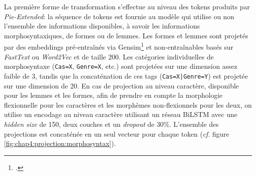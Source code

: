 La première forme de transformation s'effectue au niveau des tokens produits par \textit{Pie-Extended}: la séquence de tokens est fournie au modèle qui utilise ou non l'ensemble des informations disponibles, à savoir les informations morphosyntaxiques, de formes ou de lemmes. Les formes et lemmes sont projetés par des embeddings pré-entraînés via Gensim\footcite{gensim} et non-entraînables basés sur \textit{FastText} ou \textit{Word2Vec} et de taille 200. Les catégories individuelles de morphosyntaxe (\texttt{Cas=X}, \texttt{Genre=X}, etc.) sont projetées sur une dimension assez faible de 3, tandis que la concaténation de ces tags (\texttt{Cas=X|Genre=Y}) est projetée sur une dimension de 20. En cas de projection au niveau caractère, disponible pour les lemmes et les formes, afin de prendre en compte la morphologie flexionnelle pour les caractères et les morphèmes non-flexionnels pour les deux, on utilise un encodage au niveau caractère utilisant un réseau BiLSTM avec une \textit{hidden size} de 150, deux couches et un \textit{dropout} de 30\%. L'ensemble des projections est concaténée en un seul vecteur pour chaque token (\textit{cf.} figure \ref{fig:chap4:projection:morphosyntax}).

